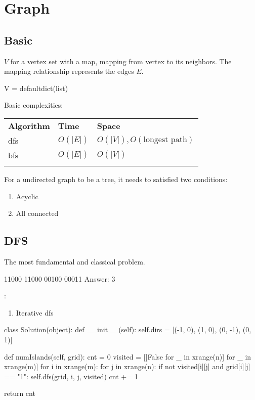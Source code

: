 \chapter{Graph}

\section{Basic}
 $V$ for a vertex set with a map, mapping from vertex to its neighbors. The mapping relationship represents the edges $E$.
\begin{python}
V = defaultdict(list)
\end{python}

 Basic complexities:

\begin{tabular}{lll}
\hline\noalign{\smallskip}
\textbf{Algorithm} & \textbf{Time}  & \textbf{Space}\\
\noalign{\smallskip}\hline\noalign{\smallskip}
dfs & $O(|E|)$ & $O(|V|), O(\text{longest path})$ \\
bfs & $O(|E|)$ & $O(|V|)$ \\
\noalign{\smallskip}\hline\noalign{\smallskip}
\caption{CAPTIONS}
\end{tabular}

 For a undirected graph to be a tree, it needs to satisfied two conditions:
\begin{enumerate}
\item Acyclic
\item All connected
\end{enumerate}
\section{DFS}
 The most fundamental and classical problem.
\begin{python}
11000
11000
00100
00011
Answer: 3
\end{python}
:
\begin{enumerate}
\item Iterative dfs
\end{enumerate}
\begin{python}
class Solution(object):
  def __init__(self):
    self.dirs = [(-1, 0), (1, 0), (0, -1), (0, 1)]

  def numIslands(self, grid):
    cnt = 0
    visited = [[False for _ in xrange(n)]
               for _ in xrange(m)]
    for i in xrange(m):
      for j in xrange(n):
        if not visited[i][j] and grid[i][j] == "1":
          self.dfs(grid, i, j, visited)
          cnt += 1

    return cnt
\end{python}

